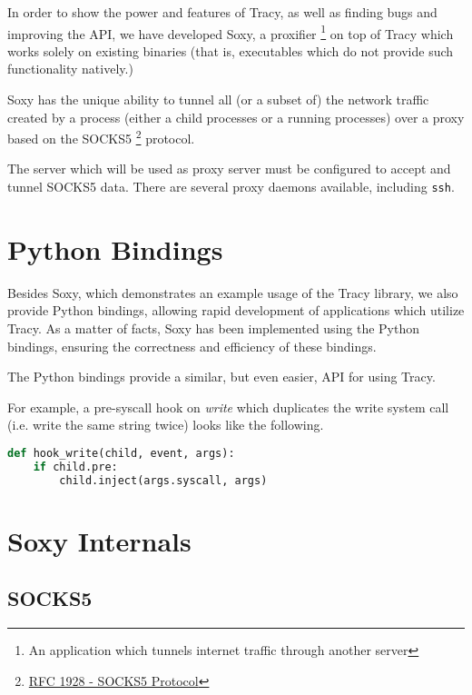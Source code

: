 \documentclass[a4paper, 10pt]{report}
\begin{document}
\label{chapter:soxy}

In order to show the power and features of Tracy, as well as finding bugs and
improving the API, we have developed Soxy, a proxifier \footnote{An
application which tunnels internet traffic through another server} on top of
Tracy which works solely on existing binaries (that is, executables which do
not provide such functionality natively.)

Soxy has the unique ability to tunnel all (or a subset of) the network traffic
created by a process (either a child processes or a running processes) over a
proxy based on the SOCKS5 \footnote{\href{http://www.ietf.org/rfc/rfc1928.txt}
{RFC 1928 - SOCKS5 Protocol}} protocol.

The server which will be used as proxy server must be configured to accept and
tunnel SOCKS5 data. There are several proxy daemons available, including
\verb=ssh=.

\section{Python Bindings}


Besides Soxy, which demonstrates an example usage of the Tracy library, we
also provide Python bindings, allowing rapid development of applications
which utilize Tracy. As a matter of facts, Soxy has been implemented using the
Python bindings, ensuring the correctness and efficiency of these bindings.

The Python bindings provide a similar, but even easier, API for using Tracy.

For example, a pre-syscall hook on \textit{write} which duplicates the write
system call (i.e. write the same string twice) looks like the following.

\begin{lstlisting}[language=Python]
def hook_write(child, event, args):
    if child.pre:
        child.inject(args.syscall, args)
\end{lstlisting}

\section{Soxy Internals}

\subsection{SOCKS5}
\label{socks5}
\end{document}
